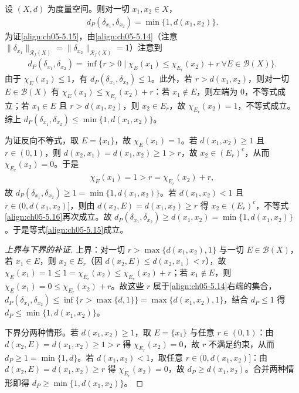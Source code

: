 \documentclass[../../main.tex]{subfiles}%
\begin{document}
\begin{example}\label{example:ch05-Delta距离}
设 $(X,d)$ 为度量空间。则对一切 $x_1,x_2\in X$，
\begin{align}
d_P(\delta_{x_1},\delta_{x_2})=\min\{1,d(x_1,x_2)\}.\label{align:ch05-5.15}
\end{align}
为证\eqref{align:ch05-5.15}，由\eqref{align:ch05-5.14}（注意 $\|\delta_{x_1}\|_{\mathscr{R}_f(X)}=\|\delta_{x_2}\|_{\mathscr{R}_f(X)}=1$）注意到
\begin{align*}
d_P(\delta_{x_1},\delta_{x_2})
=\inf\{r>0\mid\chi_E(x_1)\leqslant\chi_{E_r}(x_2)+r\ \forall E\in\mathscr{B}(X)\}.
\end{align*}
由于 $\chi_E(x_1)\leqslant1$，有 $d_P(\delta_{x_1},\delta_{x_2})\leqslant1$。此外，若 $r>d(x_1,x_2)$，则对一切 $E\in\mathscr{B}(X)$ 有 $\chi_E(x_1)\leqslant\chi_{E_r}(x_2)+r$：若 $x_1\notin E$，则左端为 $0$，不等式成立；若 $x_1\in E$ 且 $r>d(x_1,x_2)$，则 $x_2\in E_r$，故 $\chi_{E_r}(x_2)=1$，不等式成立。综上 $d_P(\delta_{x_1},\delta_{x_2})\leqslant\min\{1,d(x_1,x_2)\}$。

为证反向不等式，取 $E=\{x_1\}$，故 $\chi_E(x_1)=1$。若 $d(x_1,x_2)\geqslant1$ 且 $r\in(0,1)$，则 $d(x_2,x_1)=d(x_1,x_2)\geqslant1>r$，故 $x_2\in(E_r)^c$，从而 $\chi_{E_r}(x_2)=0$。于是
\begin{align}
\chi_E(x_1)=1>r=\chi_{E_r}(x_2)+r,\label{align:ch05-5.16}
\end{align}
故 $d_P(\delta_{x_1},\delta_{x_2})\geqslant1=\min\{1,d(x_1,x_2)\}$。若 $d(x_1,x_2)<1$ 且 $r\in(0,d(x_1,x_2)]$，则由 $d(x_2,E)=d(x_1,x_2)\geqslant r$ 得 $x_2\in(E_r)^c$，不等式\eqref{align:ch05-5.16}再次成立。故 $d_P(\delta_{x_1},\delta_{x_2})\geqslant d(x_1,x_2)=\min\{1,d(x_1,x_2)\}$。于是等式\eqref{align:ch05-5.15}成立。\end{example}

\begin{proof}[上界与下界的补证]
上界：对一切 $r>\max\{d(x_1,x_2),1\}$ 与一切 $E\in\mathscr{B}(X)$，若 $x_1\in E$，则 $x_2\in E_r$（因 $d(x_2,E)\leqslant d(x_2,x_1)<r$），故 $\chi_E(x_1)=1\leqslant1=\chi_{E_r}(x_2)\leqslant\chi_{E_r}(x_2)+r$；若 $x_1\notin E$，则 $\chi_E(x_1)=0\leqslant\chi_{E_r}(x_2)+r$。故这些 $r$ 属于\eqref{align:ch05-5.14}右端的集合，$d_P(\delta_{x_1},\delta_{x_2})\leqslant\inf\{r>\max\{d,1\}\}=\max\{d(x_1,x_2),1\}$，结合 $d_P\leqslant1$ 得 $d_P\leqslant\min\{1,d(x_1,x_2)\}$。

下界分两种情形。若 $d(x_1,x_2)\geqslant1$，取 $E=\{x_1\}$ 与任意 $r\in(0,1)$：由 $d(x_2,E)=d(x_1,x_2)\geqslant1>r$ 得 $\chi_{E_r}(x_2)=0$，故 $r$ 不满足约束，从而 $d_P\geqslant1=\min\{1,d\}$。若 $d(x_1,x_2)<1$，取任意 $r\in(0,d(x_1,x_2)]$：由 $d(x_2,E)=d(x_1,x_2)\geqslant r$ 得 $\chi_{E_r}(x_2)=0$，故 $d_P\geqslant d(x_1,x_2)$。合并两种情形即得 $d_P\geqslant\min\{1,d(x_1,x_2)\}$。
\end{proof}
\end{document}
